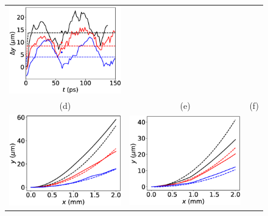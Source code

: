\documentclass[%
 reprint,
 amsmath,amssymb,
 aps,
]{revtex4-1}
\begin{document}
\begin{figure}
\begin{tabular}{ccc}
\includegraphics[scale=0.32]{bbssd_He.eps}\\
(d)&(e)&(f)\\
\includegraphics[scale=0.32]{rayparaxH300.eps}&
\includegraphics[scale=0.32]{rayparaxH100.eps}&

\end{tabular}
\end{figure}
\end{document}
